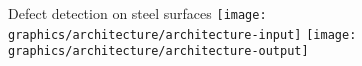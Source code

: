 

\begin{frame}{Defect detection on steel surfaces}
     {
        \texttt{[image: graphics/architecture/architecture-input]}
    }
     {
        \texttt{[image: graphics/architecture/architecture-output]}
    }
\end{frame}







